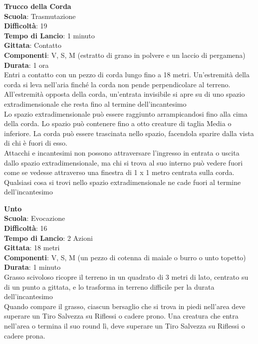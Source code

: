 \begin{multicols}{2}
\medskip\textbf{Trucco della Corda}\\
\textbf{Scuola}: Trasmutazione\\
\textbf{Difficoltà}: 19\\
\textbf{Tempo di Lancio}: 1 minuto\\
\textbf{Gittata}: Contatto\\
\textbf{Componenti}: V, S, M (estratto di grano in polvere e un laccio di pergamena)\\
\textbf{Durata}: 1 ora\\
Entri a contatto con un pezzo di corda lungo fino a 18 metri. Un'estremità della corda si leva nell'aria finché la corda non pende perpendicolare al terreno. All'estremità opposta della corda, un'entrata invisibile si apre su di uno spazio extradimensionale che resta fino al termine dell'incantesimo \\
Lo spazio extradimensionale può essere raggiunto arrampicandosi fino alla cima della corda. Lo spazio può contenere fino a otto creature di taglia Media o inferiore. La corda può essere trascinata nello spazio, facendola sparire dalla vista di chi è fuori di esso.\\
Attacchi e incantesimi non possono attraversare l'ingresso in entrata o uscita dallo spazio extradimensionale, ma chi si trova al suo interno può vedere fuori come se vedesse attraverso una finestra di 1 x 1 metro centrata sulla corda.\\
Qualsiasi cosa si trovi nello spazio extradimensionale ne cade fuori al termine dell'incantesimo

\medskip\textbf{Unto}\\
\textbf{Scuola}: Evocazione\\
\textbf{Difficoltà}: 16\\
\textbf{Tempo di Lancio}: 2 Azioni\\
\textbf{Gittata}: 18 metri\\
\textbf{Componenti}: V, S, M (un pezzo di cotenna di maiale o burro o unto topetto)\\
\textbf{Durata}: 1 minuto\\
Grasso scivoloso ricopre il terreno in un quadrato di 3 metri di lato, centrato su di un punto a gittata, e lo trasforma in terreno difficile per la durata dell'incantesimo\\
Quando compare il grasso, ciascun bersaglio che si trova in piedi nell'area deve superare un Tiro Salvezza su Riflessi o cadere prono. Una creatura che entra nell'area o termina il suo round lì, deve superare un Tiro Salvezza su Riflessi o cadere prona.\\


\end{multicols}
